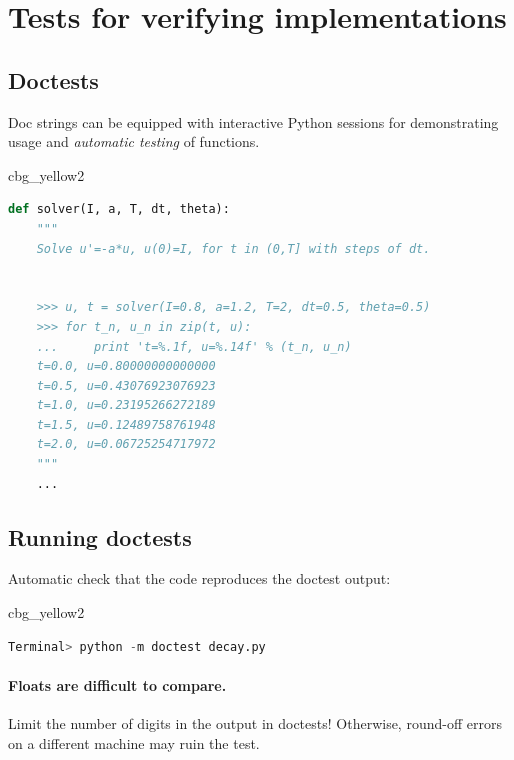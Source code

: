 \documentclass[%
oneside,                 %
final,                   %
10pt]{article}
\newenvironment{_cod_tight}[1]{
   \def\FrameCommand{\colorbox{#1}}
   \FrameRule0.6pt\MakeFramed {\FrameRestore}\vskip3mm}
   {\vskip0mm\endMakeFramed}
\newenvironment{cod}[1]{
\bgroup\rmfamily
\fboxsep=0mm\relax
\begin{_cod_tight}{#1}
\list{}{\parsep=-2mm\parskip=0mm\topsep=0pt\leftmargin=2mm
\rightmargin=2\leftmargin\leftmargin=4pt\relax}
\item\relax}
{\endlist\end{_cod_tight}\egroup}
\begin{document}
\noindent
\section*{Tests for verifying implementations}

\subsection*{Doctests}


Doc strings can be equipped with interactive Python sessions for
demonstrating usage and \emph{automatic testing} of functions.

\begin{cod}{cbg_yellow2}\begin{lstlisting}[language=Python,style=simple,xleftmargin=2mm]
def solver(I, a, T, dt, theta):
    """
    Solve u'=-a*u, u(0)=I, for t in (0,T] with steps of dt.


    >>> u, t = solver(I=0.8, a=1.2, T=2, dt=0.5, theta=0.5)
    >>> for t_n, u_n in zip(t, u):
    ...     print 't=%.1f, u=%.14f' % (t_n, u_n)
    t=0.0, u=0.80000000000000
    t=0.5, u=0.43076923076923
    t=1.0, u=0.23195266272189
    t=1.5, u=0.12489758761948
    t=2.0, u=0.06725254717972
    """
    ...
\end{lstlisting}\end{cod}
\noindent

\subsection*{Running doctests}

Automatic check that the code reproduces the doctest output:

\begin{cod}{cbg_yellow2}\begin{lstlisting}[language=Python,style=simple,xleftmargin=2mm]
Terminal> python -m doctest decay.py
\end{lstlisting}\end{cod}
\noindent


\paragraph{Floats are difficult to compare.}
Limit the number of digits in the output in doctests! Otherwise,
round-off errors on a different machine may ruin the test.
\end{document}
